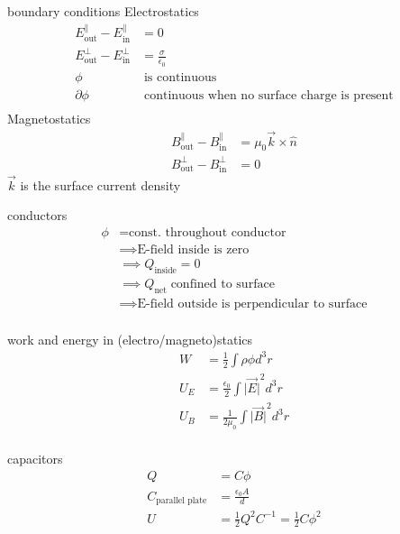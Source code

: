 \documentclass[avery5388, frame]{flashcards}
\begin{document}
\begin{flashcard}{boundary conditions}
  {
    Electrostatics
    \begin{align*}
      E^{\parallel}_{\textrm{out}} - E^{\parallel}_{\textrm{in}} &= 0\\
      E^{\bot}_{\textrm{out}} - E^{\bot}_{\textrm{in}} &= \frac{\sigma}{\epsilon_{0}}\\
      \phi &\; \textrm{is continuous}\\
      \partial \phi &\; \textrm{continuous when no surface charge is present}\\
    \end{align*}
    Magnetostatics
    \begin{align*}
      B^{\parallel}_{\textrm{out}} - B^{\parallel}_{\textrm{in}} &= \mu_{0} \vec{k} \times \hat{n}\\
      B^{\bot}_{\textrm{out}} - B^{\bot}_{\textrm{in}} &= 0
    \end{align*}
    $\vec{k}$ is the surface current density
  }
\end{flashcard}

\begin{flashcard}{conductors}
  {
    \begin{align*}
      \phi &= \textrm{const. throughout conductor}\\
      & \implies \textrm{E-field inside is zero}\\
      & \implies Q_{\textrm{inside}} = 0\\
      & \implies Q_{\textrm{net}} \; \textrm{confined to surface}\\
      & \implies \textrm{E-field outside is perpendicular to surface}\\
    \end{align*}
  }
\end{flashcard}

\begin{flashcard}{work and energy in (electro/magneto)statics}
  {
    \begin{align*}
      W &= \frac{1}{2} \int \rho \phi d^{3}r\\
      U_{E} &= \frac{\epsilon_{0}}{2} \int {\lvert \vec{E} \lvert}^{2} d^{3}r\\
      U_{B} &= \frac{1}{2 \mu_{0}} \int {\lvert \vec{B} \lvert}^{2} d^{3}r\\
    \end{align*}
  }
\end{flashcard}

\begin{flashcard}{capacitors}
  {
    \begin{align*}
      Q &= C \phi\\
      C_{\textrm{parallel plate}} &= \frac{\epsilon_{0} A}{d}\\
      U &= \frac{1}{2} Q^{2} C^{-1} = \frac{1}{2} C \phi^{2}\\
    \end{align*}
  }
\end{flashcard}
\end{document}
